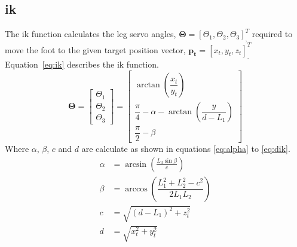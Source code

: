     \subsection{\acf{ik}}
        The \ac{ik} function calculates the leg servo angles, \(\boldsymbol{\Theta} = [\Theta_1, \Theta_2, \Theta_3]^T_{\displaystyle ,}\) required
        to move the foot to the given target position vector, \(\boldsymbol{p_t} = [x_t,y_t,z_t]^T_{\displaystyle .}\)
        \hbox{Equation \ref{eq:ik}} describes the \ac{ik} function.
        \begin{equation}\label{eq:ik}
            \boldsymbol{\Theta} =
                                \begin{bmatrix}
                                    \Theta_1\\
                                    \Theta_2\\
                                    \Theta_3
                                \end{bmatrix}
                                =
                                \begin{bmatrix}
                                    \arctan{\left(\dfrac{x_t}{y_t}\right)}\\[0.5cm]
                                    \dfrac{\pi}{4} - \alpha - \arctan{\left(\dfrac{y}{d-L_1}\right)}\\[0.5cm]
                                    \dfrac{\pi}{2} - \beta
                                \end{bmatrix}
        \end{equation}
        Where \(\alpha\), \(\beta\), \(c\) and \(d\) are calculate as shown in equations \ref{eq:alpha} to \ref{eq:dik}.
        \begin{align}
            \alpha &= \arcsin{\left(\frac{L_3\sin{\beta}}{c}\right)} \label{eq:alpha} \\
            \beta &= \arccos{\left(\dfrac{L_1^2 + L_2^2 -c^2}{2L_1L_2}\right)}\\
            c &= \sqrt{(d-L_1)^2+z_t^2}\\
            d &= \sqrt{x_t^2 + y_t^2} \label{eq:dik}
        \end{align}
